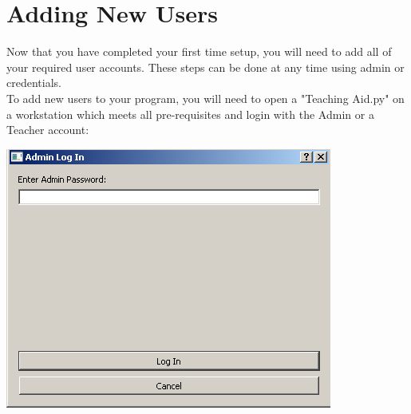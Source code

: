 \documentclass{report}
\begin{document}
\chapter{Adding New Users}
Now that you have completed your first time setup, you will need to add all of your required user accounts. These steps can be done at any time using admin or credentials.\\
To add new users to your program, you will need to open a "Teaching Aid.py" on a workstation which meets all pre-requisites and login with the Admin or a Teacher account:\\

\bigskip

\includegraphics{adminlogin}\\
\bigskip
\end{document}
